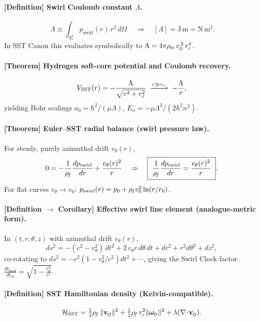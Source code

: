 \documentclass[11pt]{article}
\begin{document}
    \paragraph{[Definition] Swirl Coulomb constant \(\Lambda\).}
    \[
        \boxed{\ \Lambda \equiv \int_{S_r^2} p_{\text{swirl}}(r)\, r^2\, d\Omega\ } \quad\Rightarrow\quad [\Lambda]=\mathrm{J\,m}=\mathrm{N\,m^2}.
    \]
    In SST Canon this evaluates symbolically to \( \Lambda=4\pi \rhom\, \vscore^{\,2}\, \rc^4\).

    \paragraph{[Theorem] Hydrogen soft-core potential and Coulomb recovery.}
    \[
        V_{\text{SST}}(r)=-\frac{\Lambda}{\sqrt{r^2+r_c^2}}
        \;\xrightarrow{r\gg r_c}\;
        -\frac{\Lambda}{r},
    \]
    yielding Bohr scalings
    \(a_0=\hbar^2/(\mu\Lambda)\), \(E_n=-\mu\Lambda^2/(2\hbar^2 n^2)\).

    \paragraph{[Theorem] Euler–SST radial balance (swirl pressure law).}
    For steady, purely azimuthal drift \(v_\theta(r)\),
    \[
        0=-\frac{1}{\rhof}\frac{dp_{\text{swirl}}}{dr}+\frac{v_\theta(r)^2}{r}
        \quad\Rightarrow\quad
        \boxed{\ \frac{1}{\rhof}\frac{dp_{\text{swirl}}}{dr}=\frac{v_\theta(r)^2}{r}\ }.
    \]
    For flat curves \(v_\theta\to v_0\): \(p_{\text{swirl}}(r)=p_0+\rho_{\!f} v_0^2 \ln(r/r_0)\).

    \paragraph{[Definition \(\to\) Corollary] Effective swirl line element (analogue-metric form).}
    In \((t,r,\theta,z)\) with azimuthal drift \(v_\theta(r)\),
    \[
        ds^2=-(c^2-v_\theta^2)\,dt^2+2\,v_\theta r\,d\theta\,dt+dr^2+r^2d\theta^2+dz^2,
    \]
    co-rotating to \(ds^2=-c^2(1-v_\theta^2/c^2)dt^2+\cdots\), giving the Swirl Clock factor
    \(\displaystyle \frac{dt_{\text{local}}}{dt_\infty}=\sqrt{1-\frac{v_\theta^2}{c^2}}\).

    \paragraph{[Definition] SST Hamiltonian density (Kelvin-compatible).}
    \[
        \mathcal{H}_{\text{SST}}=\tfrac12\rhof\,\|\vswirl\|^2+\tfrac12\rhof\,\rc^2\|\omegas\|^2+\lambda(\nabla\!\cdot\!\vswirl).
    \]
\end{document}
